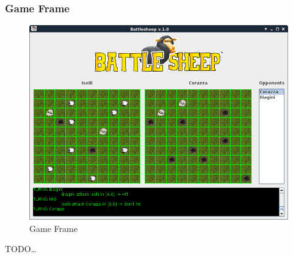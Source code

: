 \subsubsection{Game Frame}
\begin{figure}[!h]
	\centering
	\includegraphics[scale=0.5]{core/imgs/gui/game_frame}
	\caption{Game Frame}
	\label{figuregame_frame}
\end{figure}
TODO\dots
